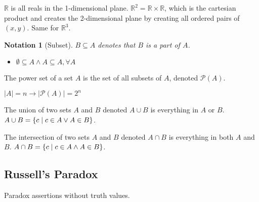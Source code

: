 \documentclass[11pt]{scrartcl}
\theoremstyle{dotlessP}
\theoremstyle{dotlessN}
\newtheorem{notation}[theorem]{Notation}
\DeclarePairedDelimiter\set{\{}{\}}
\newcommand{\unite}{\cup}
\newcommand{\inter}{\cap}
\newcommand{\reals}{\mathbb{R}} %
\newcommand{\powset}{\mathcal{P}} %
\begin{document}
\begin{example}
	[Planes]
	$\reals$ is all reals in the 1-dimensional plane. $\reals^2 = \reals \times \reals$, which is the cartesian product and creates the 2-dimensional plane by creating all ordered pairs of $(x,y)$. Same for $\reals^3$.
\end{example}
\begin{notation}
	[Subset]
	$B \subseteq A$ denotes that $B$ is a part of $A$.
\end{notation}
\begin{itemize}
	\item $\emptyset \subseteq A \land A \subseteq A, \forall A$
\end{itemize}
\begin{definition}
	The power set of a set $A$ is the set of all subsets of $A$, denoted $\mathcal{P}(A)$.
\end{definition}
\begin{remark}
	$|A| = n \to |\powset(A)| = 2^n$
\end{remark}
\begin{definition}
	[Union]
	The union of two sets  $ A$ and $B$ denoted $A \unite B$ is everything in $A$ or $B$. $A \unite B = \set*{c \mid c \in A \lor A \in B}$.
\end{definition}
\begin{definition}
	[Intersection]
	The intersection of two sets $A$ and $B$ denoted $A \inter B$ is everything in both $A$ and $B$. $A \inter B = \set*{c \mid c \in A \land A \in B}$.
\end{definition}
\subsection{Russell's Paradox}
Paradox assertions without truth values.
\end{document}

